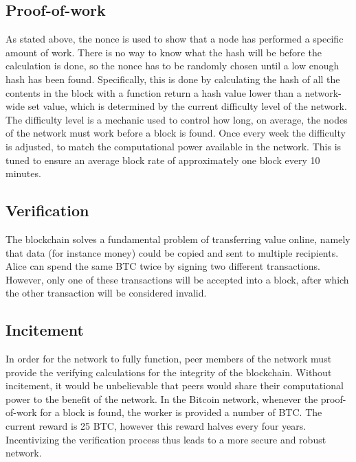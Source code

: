 \subsection{Proof-of-work}
As stated above, the nonce is used to show that a node has performed a specific amount of work. There is no way to know what the hash will be before the calculation is done, so the nonce has to be randomly chosen until a low enough hash has been found. Specifically, this is done by calculating the hash of all the contents in the block with a function return a hash value lower than a network-wide set value, which is determined by the current difficulty level of the network. The difficulty level is a mechanic used to control how long, on average, the nodes of the network must work before a block is found. Once every week the difficulty is adjusted, to match the computational power available in the network. This is tuned to ensure an average block rate of approximately one block every 10 minutes. 

\subsection{Verification}
The blockchain solves a fundamental problem of transferring value online, namely that data (for instance money) could be copied and sent to multiple recipients. Alice can spend the same BTC twice by signing two different transactions. However, only one of these transactions will be accepted into a block, after which the other transaction will be considered invalid.

\subsection{Incitement}
In order for the network to fully function, peer members of the network must provide the verifying calculations for the integrity of the blockchain. Without incitement, it would be unbelievable that peers would share their computational power to the benefit of the network. In the Bitcoin network, whenever the proof-of-work for a block is found, the worker is provided a number of BTC. The current reward is 25 BTC, however this reward halves every four years. Incentivizing the verification process thus leads to a more secure and robust network.

